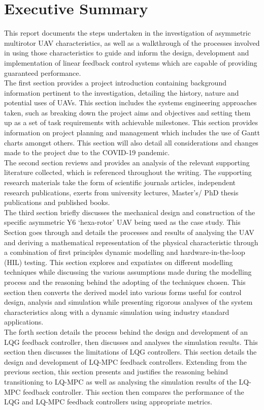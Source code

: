 \documentclass[12pt,a4paper,twoside]{report}
\begin{document}
	\section{Executive Summary}
		This report documents the steps undertaken in the investigation of asymmetric multirotor UAV characteristics, as well as a walkthrough of the processes involved in using those characteristics to guide and inform the design, development and implementation of linear feedback control systems which are capable of providing guaranteed performance.
		\\
		The first section provides a project introduction containing background information pertinent to the investigation, detailing the history, nature and potential uses of UAVs. This section includes the systems engineering approaches taken, such as breaking down the project aims and objectives and setting them up as a set of task requirements with achievable milestones. This section provides information on project planning and management which includes the use of Gantt charts amongst others. This section will also detail all considerations and changes made to the project due to the COVID-19 pandemic.
		\\
		The second section reviews and provides an analysis of the relevant supporting literature collected, which is referenced throughout the writing. The supporting research materials take the form of scientific journals articles, independent research publications, exerts from university lectures, Master’s/ PhD thesis publications and published books.
		\\ 
		The third section briefly discusses the mechanical design and construction of the specific asymmetric Y6 ‘hexa-rotor’ UAV being used as the case study. This Section goes through and details the processes and results of analysing the UAV and deriving a mathematical representation of the physical characteristic through a combination of first principles dynamic modelling and hardware-in-the-loop (HIL) testing. This section explores and expatiates on different modelling techniques while discussing the various assumptions made during the modelling process and the reasoning behind the adopting of the techniques chosen. This section then converts the derived model into various forms useful for control design, analysis and simulation while presenting rigorous analyses of the system characteristics along with a dynamic simulation using industry standard applications.
		\\
		The forth section details the process behind the design and development of an LQG feedback controller, then discusses and analyses the simulation results. This section then discusses the limitations of LQG controllers. This section details the design and development of LQ-MPC feedback controllers. Extending from the previous section, this section presents and justifies the reasoning behind transitioning to LQ-MPC as well as analysing the simulation results of the LQ-MPC feedback controller. This section then compares the performance of the LQG and LQ-MPC feedback controllers using appropriate metrics.
\end{document}
